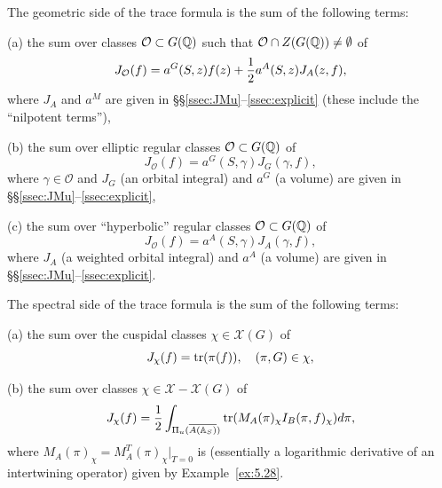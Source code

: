 The geometric side of the trace formula is the sum of the following terms:

(a) the sum over classes ${\mathcal{O}}\subset G(\mathbb{Q} )$
such that ${\mathcal{O}}\cap Z(G(\mathbb{Q} ))\not= \emptyset$ of
\begin{equation}\label{eq:5.24}
J_{\mathcal{O}}(f)=
a^G(S,z)f(z)+{1\over 2}a^A(S,z)J_A(z,f),
\end{equation}
where $J_A$ and $a^M$ are given in \S\S\ref{ssec:JMu}--\ref{ssec:explicit} (these include the
``nilpotent terms''),

(b) the sum over elliptic regular classes ${\mathcal{O}}\subset G(\mathbb{Q} )$
of
\begin{equation}\label{eq:5.25}
J_{\mathcal{O}}(f)=
a^G(S,\gamma)J_G(\gamma,f),
\end{equation}
where $\gamma\in {\mathcal{O}}$ and
$J_G$ (an orbital integral) and $a^G$ (a volume)
are given in \S\S\ref{ssec:JMu}--\ref{ssec:explicit},

(c) the sum over ``hyperbolic'' regular classes
${\mathcal{O}}\subset G(\mathbb{Q} )$
of
\begin{equation}\label{eq:5.26}
J_{\mathcal{O}}(f)=
a^A(S,\gamma)J_A(\gamma,f),
\end{equation}
where $J_A$ (a weighted orbital integral) and $a^A$ (a volume)
are given in \S\S\ref{ssec:JMu}--\ref{ssec:explicit}.

The spectral side of the trace formula is the sum of the following terms:

(a) the sum over the cuspidal classes $\chi\in {\mathcal{X}}(G)$ of
\begin{equation}\label{eq:5.27}
J_\chi(f)=
{\rm tr}(\pi(f)),\ \ \ (\pi,G)\in\chi,
\end{equation}

(b) the sum over classes $\chi\in {\mathcal{X}}-{\mathcal{X}}(G)$ of
\begin{equation}\label{eq:5.28}
J_\chi(f)=
{1\over 2}\int_{\Pi_u(\overline{A(\mathbb{A} _S)})}
{\rm tr}(M_A(\pi)_\chi I_B(\pi,f)_\chi)d\pi,
\end{equation}
where $M_A(\pi)_\chi =M_A^T(\pi)_\chi|_{T=0}$ is
(essentially a logarithmic derivative of an intertwining operator)
given by Example~\ref{ex:5.28}.


